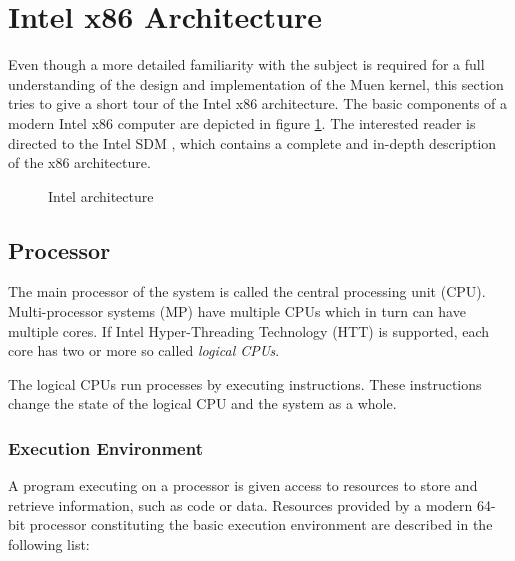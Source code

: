 \section{Intel x86 Architecture}
Even though a more detailed familiarity with the subject is required for a full
understanding of the design and implementation of the Muen kernel, this section
tries to give a short tour of the Intel x86 architecture. The basic components
of a modern Intel x86 computer are depicted in figure
\ref{fig:intel-architecture}. The interested reader is directed to the Intel SDM
\cite{IntelSDM}, which contains a complete and in-depth description of the x86
architecture.

\begin{figure}[h]
	\centering
	
	\caption{Intel architecture}
	\label{fig:intel-architecture}
\end{figure}

\subsection{Processor}
The main processor of the system is called the central processing unit
(CPU). Multi-processor systems (MP) have multiple CPUs
which in turn can have multiple cores. If Intel Hyper-Threading Technology
(HTT) is supported, each core has two or more so called
\emph{logical CPUs}.

The logical CPUs run processes by executing instructions. These instructions
change the state of the logical CPU and the system as a whole.

\subsubsection{Execution Environment}\label{subsubsec:exec-env}
A program executing on a processor is given access to resources to store and
retrieve information, such as code or data. Resources provided by a modern
64-bit processor constituting the basic execution environment are described in the following list:

